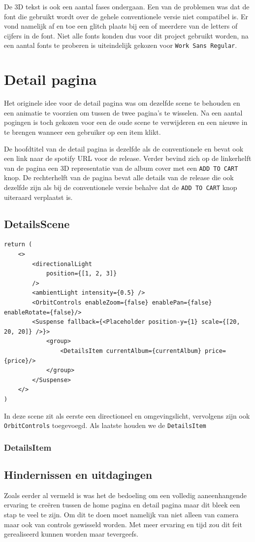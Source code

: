 De 3D tekst is ook een aantal fases ondergaan. Een van de problemen was dat de font die gebruikt wordt over de gehele conventionele versie niet compatibel is. Er vond namelijk af en toe een glitch plaats bij een of meerdere van de letters of cijfers in de font. Niet alle fonts konden dus voor dit project gebruikt worden, na een aantal fonts te proberen is uiteindelijk gekozen voor \texttt{Work Sans Regular}.

\section{Detail pagina}

Het originele idee voor de detail pagina was om dezelfde scene te behouden en een animatie te voorzien om tussen de twee pagina's te wisselen. Na een aantal pogingen is toch gekozen voor een de oude scene te verwijderen en een nieuwe in te brengen wanneer een gebruiker op een item klikt.

De hoofdtitel van de detail pagina is dezelfde als de conventionele en bevat ook een link naar de spotify URL voor de release. Verder bevind zich op de linkerhelft van de pagina een 3D representatie van de album cover met een \texttt{ADD TO CART} knop. De rechterhelft van de pagina bevat alle details van de release die ook dezelfde zijn als bij de conventionele versie behalve dat de \texttt{ADD TO CART} knop uiteraard verplaatst is.

\subsection{DetailsScene}

\begin{BVerbatim}
return (
	<>
		<directionalLight 
			position={[1, 2, 3]} 
		/>
		<ambientLight intensity={0.5} />
		<OrbitControls enableZoom={false} enablePan={false} enableRotate={false}/>
		<Suspense fallback={<Placeholder position-y={1} scale={[20, 20, 20]} />}>
			<group>
				<DetailsItem currentAlbum={currentAlbum} price={price}/>
			</group>
		</Suspense>
	</>
)
\end{BVerbatim}

In deze scene zit als eerste een directioneel en omgevingslicht, vervolgens zijn ook \texttt{OrbitControls} toegevoegd. Als laatste houden we de \texttt{DetailsItem} 

\subsubsection{DetailsItem}





\subsection{Hindernissen en uitdagingen}

Zoals eerder al vermeld is was het de bedoeling om een volledig aaneenhangende ervaring te creëren tussen de home pagina en detail pagina maar dit bleek een stap te veel te zijn. Om dit te doen moet namelijk van niet alleen van camera maar ook van controls gewisseld worden. Met meer ervaring en tijd zou dit feit gerealiseerd kunnen worden maar tevergeefs.